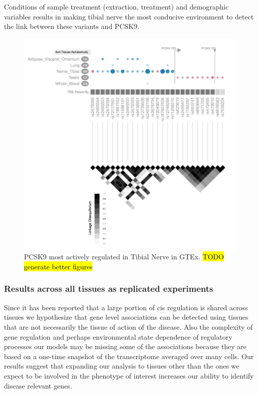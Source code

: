 \documentclass[10pt]{article}
\begin{document}
Conditions of sample treatment (extraction, treatment) and demographic variables results in making tibial nerve the most conducive environment to detect the link between these variants and PCSK9.

\begin{figure}
\includegraphics[width=\textwidth]{plots/Fig10-PCSK9-eQTL-Visualizer.png}
\caption{PCSK9 most actively regulated in Tibial Nerve in GTEx. \hl{TODO generate better figures}}
\label{fig:PCSK9-eqtl}
\end{figure}


\subsubsection*{Results across all tissues as replicated experiments}

Since it has been reported that a large portion of cis regulation is shared across tissues we hypothesize that gene level associations can be detected using tissues that are not necessarily the tissue of action of the disease. Also the complexity of gene regulation and perhaps environmental state dependence of regulatory processes our models may be missing some of the associations because they are based on a one-time snapshot of the transcriptome averaged over many cells. Our results suggest that expanding our analysis to tissues other than the ones we expect to be involved in the phenotype of interest increases our ability to identify disease relevant genes. 
\end{document}
